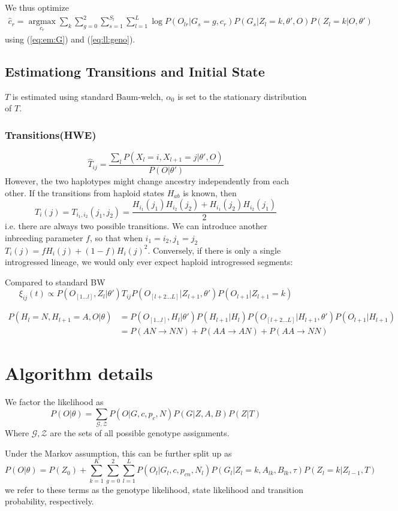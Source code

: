 \documentclass[10pt,a4paper]{article}
\begin{document}
We thus optimize
\begin{align}
\hat{c}_r = \operatorname*{argmax}_{c_r}\sum_k\sum_{g=0}^2 \sum_{s=1}^{S_l}\sum_{l=1}^L \log P(O_{lr} | G_s=g, c_r)  P(G_s|Z_l=k, \theta', O) P(Z_l=k | O, \theta')
\end{align}
using (\ref{eq:em:G}) and (\ref{eq:ll:geno}).
\subsection{Estimationg Transitions and Initial State}
$T$ is estimated using standard Baum-welch, $\alpha_0$ is set to the stationary distribution of $T$.
\subsubsection{Transitions(HWE)}
$$\hat{T}_{ij} = \frac{\sum_l P(X_l=i, X_{l+1}=j| \theta', O)}{ P(O | \theta')}$$
However, the two haplotypes might change ancestry independently from each other. If the transitions from haploid states $H_{ab}$ is known, then 
$$T_i(j) = T_{i_1, i_2}(j_1, j_2) = \frac{H_{i_1}(j_1)H_{i_2}(j_2) + H_{i_1}(j_2)H_{i_2}(j_1)}{2}$$
i.e. there are always two possible transitions. We can introduce another inbreeding parameter $f$, so that when $i_1=i_2, j_1=j_2$ 
$T_i(j) = f H_i(j) + (1-f) H_i(j)^2$. Conversely, if there is only a single introgressed lineage, we would only ever expect haploid introgressed segments:



Compared to standard BW
$$\xi_{ij}(t) \propto P(O_{[1\dots l]}, Z_l | \theta') T_{ij}  P(O_{[l+2\dots L]}|Z_{l+1}, \theta') P(O_{l+1}|Z_{l+1}=k)$$

\begin{align}
P(H_l = N, H_{l+1} = A, O |\theta) &=  P(O_{[1\dots l]}, H_l | \theta') P(H_{l+1} | H_l) P(O_{[l+2\dots L]}|H_{l+1}, \theta') P(O_{l+1}|H_{l+1})\\
&=P(AN \to NN) + P(AA \to AN) + P(AA \to NN)
\end{align}


\section{Algorithm details}
We factor the likelihood as 
$$P(O | \theta) =  \sum_{\mathcal{G}, \mathcal{Z}} P(O | G, c, p_c, N)P(G | Z, A, B) P(Z| T)$$
Where $\mathcal{G}, \mathcal{Z}$ are the sets of all possible genotype assignments.

Under the Markov assumption, this can be further split up as
$$P(O | \theta) = P(Z_0) +
\sum_{k=1}^K \sum_{g=0}^2 \sum_{l=1}^L 
P(O_l | G_l, c, p_{cn}, N_l)
P(G_l | Z_l = k, A_{lk}, B_{lk}, \tau)
P(Z_l = k |Z_{l-1}, T) $$
we refer to these terms as the genotype likelihood, state likelihood and transition probability, respectively.
\end{document}
